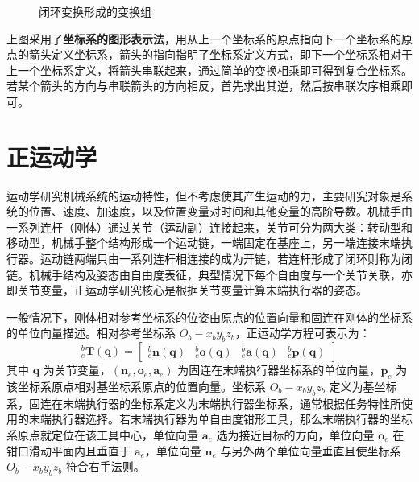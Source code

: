 \documentclass[cn,11pt,chinese,blue,bibstyle=ieeetr]{elegantbook}
\begin{document}
\begin{figure}[htbp]
	\caption{闭环变换形成的变换组}
\end{figure}

上图采用了\textbf{坐标系的图形表示法}，用从上一个坐标系的原点指向下一个坐标系的原点的箭头定义坐标系，箭头的指向指明了坐标系定义方式，即下一个坐标系相对于上一个坐标系定义，将箭头串联起来，通过简单的变换相乘即可得到复合坐标系。若某个箭头的方向与串联箭头的方向相反，首先求出其逆，然后按串联次序相乘即可。

\section{正运动学}\label{direct_kinematics}

运动学研究机械系统的运动特性，但不考虑使其产生运动的力，主要研究对象是系统的位置、速度、加速度，以及位置变量对时间和其他变量的高阶导数。机械手由一系列连杆（刚体）通过关节（运动副）连接起来，关节可分为两大类：转动型和移动型，机械手整个结构形成一个运动链，一端固定在基座上，另一端连接末端执行器。运动链两端只由一系列连杆相连接的成为开链，若连杆形成了闭环则称为闭链。机械手结构及姿态由自由度表征，典型情况下每个自由度与一个关节关联，亦即关节变量，正运动学研究核心是根据关节变量计算末端执行器的姿态。

一般情况下，刚体相对参考坐标系的位姿由原点的位置向量和固连在刚体的坐标系的单位向量描述。相对参考坐标系 $O_b-x_by_bz_b$，正运动学方程可表示为：
\begin{equation}
{_e^b\bm{T}}\left(\bm{q}\right) = \begin{bmatrix}
{_e^b\bm{n}}\left(\bm{q}\right) & {_e^b\bm{o}}\left(\bm{q}\right) & {_e^b\bm{a}}\left(\bm{q}\right) & {_e^b\bm{p}}\left(\bm{q}\right)
\end{bmatrix}
\end{equation}
其中 $\bm{q}$ 为关节变量，$\left(\bm{n}_e,\bm{o}_e,\bm{a}_e\right)$ 为固连在末端执行器坐标系的单位向量，$\bm{p}_e$ 为该坐标系原点相对基坐标系原点的位置向量。坐标系 $O_b-x_by_bz_b$ 定义为基坐标系，固连在末端执行器的坐标系定义为末端执行器坐标系，通常根据任务特性所使用的末端执行器选择。若末端执行器为单自由度钳形工具，那么末端执行器的坐标系原点就定位在该工具中心，单位向量 $\bm{a}_e$ 选为接近目标的方向，单位向量 $\bm{o}_e$ 在钳口滑动平面内且垂直于 $\bm{a}_e$，单位向量 $\bm{n}_e$ 与另外两个单位向量垂直且使坐标系 $O_b-x_by_bz_b$ 符合右手法则。
\end{document}
